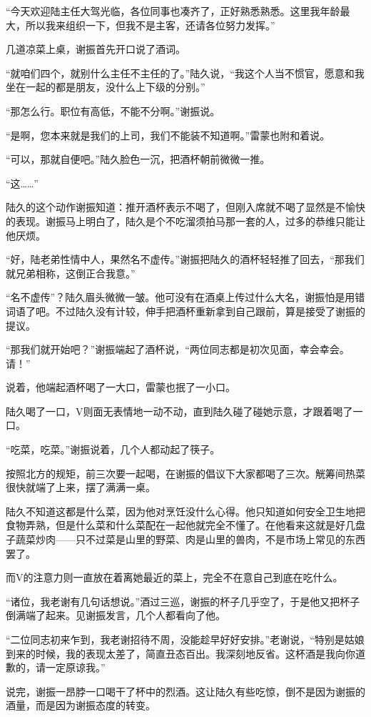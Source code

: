 “今天欢迎陆主任大驾光临，各位同事也凑齐了，正好熟悉熟悉。这里我年龄最大，所以我来组织一下，但我不是主客，还请各位努力发挥。”

几道凉菜上桌，谢振首先开口说了酒词。

“就咱们四个，就别什么主任不主任的了。”陆久说，“我这个人当不惯官，愿意和我坐在一起的都是朋友，没什么上下级的分别。”

“那怎么行。职位有高低，不能不分啊。”谢振说。

“是啊，您本来就是我们的上司，我们不能装不知道啊。”雷蒙也附和着说。

“可以，那就自便吧。”陆久脸色一沉，把酒杯朝前微微一推。

“这……”

陆久的这个动作谢振知道：推开酒杯表示不喝了，但刚入席就不喝了显然是不愉快的表现。谢振马上明白了，陆久是个不吃溜须拍马那一套的人，过多的恭维只能让他厌烦。

“好，陆老弟性情中人，果然名不虚传。”谢振把陆久的酒杯轻轻推了回去，“那我们就兄弟相称，这倒正合我意。”

“名不虚传”？陆久眉头微微一皱。他可没有在酒桌上传过什么大名，谢振怕是用错词语了吧。不过陆久没有计较，伸手把酒杯重新拿到自己跟前，算是接受了谢振的提议。

“那我们就开始吧？”谢振端起了酒杯说，“两位同志都是初次见面，幸会幸会。请！”

说着，他端起酒杯喝了一大口，雷蒙也抿了一小口。

陆久喝了一口，V则面无表情地一动不动，直到陆久碰了碰她示意，才跟着喝了一口。

“吃菜，吃菜。”谢振说着，几个人都动起了筷子。

按照北方的规矩，前三次要一起喝，在谢振的倡议下大家都喝了三次。觥筹间热菜很快就端了上来，摆了满满一桌。

陆久不知道这都是什么菜，因为他对烹饪没什么心得。他只知道如何安全卫生地把食物弄熟，但是什么菜和什么菜配在一起他就完全不懂了。在他看来这就是好几盘子蔬菜炒肉——只不过菜是山里的野菜、肉是山里的兽肉，不是市场上常见的东西罢了。

而V的注意力则一直放在着离她最近的菜上，完全不在意自己到底在吃什么。

“诸位，我老谢有几句话想说。”酒过三巡，谢振的杯子几乎空了，于是他又把杯子倒满端了起来。见谢振发言，几个人都看向了他。

“二位同志初来乍到，我老谢招待不周，没能趁早好好安排。”老谢说，“特别是姑娘到来的时候，我的表现太差了，简直丑态百出。我深刻地反省。这杯酒是我向你道歉的，请一定原谅我。”

说完，谢振一昂脖一口喝干了杯中的烈酒。这让陆久有些吃惊，倒不是因为谢振的酒量，而是因为谢振态度的转变。

